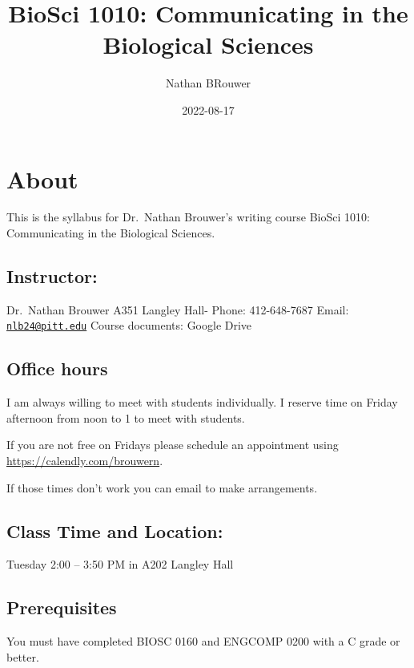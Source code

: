 \documentclass[
]{book}
\title{BioSci 1010: Communicating in the Biological Sciences}
\author{Nathan BRouwer}
\date{2022-08-17}
\begin{document}
\maketitle

{
\setcounter{tocdepth}{1}
\tableofcontents
}
\hypertarget{about}{%
\chapter{About}\label{about}}

This is the syllabus for Dr.~Nathan Brouwer's writing course BioSci 1010: Communicating in the Biological Sciences.

\hypertarget{instructor}{%
\section{Instructor:}\label{instructor}}

Dr.~Nathan Brouwer
A351 Langley Hall-
Phone: 412-648-7687
Email: \href{mailto:nlb24@pitt.edu}{\nolinkurl{nlb24@pitt.edu}}
Course documents: Google Drive

\hypertarget{office-hours}{%
\section{Office hours}\label{office-hours}}

I am always willing to meet with students individually. I reserve time on Friday afternoon from noon to 1 to meet with students.

If you are not free on Fridays please schedule an appointment using \url{https://calendly.com/brouwern}.

If those times don't work you can email to make arrangements.

\hypertarget{class-time-and-location}{%
\section{Class Time and Location:}\label{class-time-and-location}}

Tuesday 2:00 -- 3:50 PM in A202 Langley Hall

\hypertarget{prerequisites}{%
\section{Prerequisites}\label{prerequisites}}

You must have completed BIOSC 0160 and ENGCOMP 0200 with a C grade or better.
\end{document}
